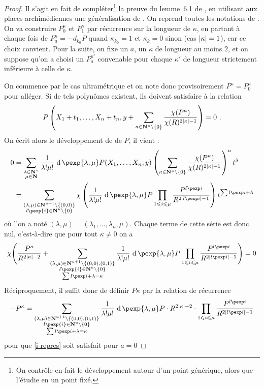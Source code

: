 \begin{proof}
  Il s'agit en fait de compléter\footnote{On contrôle en fait le développement
    autour d'un point générique, alors que  l'étudie en un point
    fixé.} la preuve du lemme~6.1 de \cite{remivds}, en
  utilisant aux places archimédiennes une généralisation de
  \cite[relation~2.3.1, p.~63]{farhith}. On reprend toutes les notations de
  \cite{remivds}. On va construire $P_0^\kappa$ et $P_1^\kappa$ par récurrence
  sur la longueur de $\kappa$, en partant à chaque fois de $P_a^\kappa = -
  d_{k_0}P$ quand $\kappa_{k_0} = 1$ et $\kappa_k = 0$ sinon (cas $\lvert\kappa\rvert
  = 1$), car ce choix convient. Pour la suite, on fixe un $a$, un $\kappa$ de
  longueur au moins $2$, et on suppose qu'on a choisi un $P_a^{\kappa'}$
  convenable pour chaque $\kappa'$ de longueur strictement inférieure à celle
  de $\kappa$.

  On commence par le cas ultramétrique et on note donc provisoirement $P^\kappa
  = P_0^\kappa$ pour alléger. Si de tels polynômes existent, ils doivent
  satisfaire à la relation
  \[
    P\left( X_1+t_1, \ldots, X_n+t_n, y + \sum_{\kappa \in {\mathbf{N}}^u\setminus\{0\}}
    \frac{\chi(P^\kappa)}{\chi(R)^{2\lvert\kappa\rvert -1}}\right) = 0 \text{ .}
  \]
  On écrit alors le développement de  de $P$, il vient :
  \begin{align*}
    0
    & = \sum_{\substack{\lambda\in\N^u \\ \mu \in \N}} \frac1{\lambda!\mu!}\,
      \diff\pexp{\lambda, \mu}P(X_1,\ldots, X_n,y) \left(\sum_{\kappa \in
      \N^u\setminus\{0\}} \frac{\chi(P^\kappa)}{\chi(R)^{2\lgr\kappa -1}}
      \right)^u t^\lambda \\
    & = \sum_{\substack{(\lambda,\mu)\in\N^{u+1}\setminus\{(0,0)\}\\
      l\pexp{i} \in \N^u\setminus\{0\}}} \chi\left( \frac1{\lambda!\mu!}\,
      \diff\pexp{\lambda,\mu}P \prod_{1\le i \le \mu}
      \frac{P^{l\pexp i}}{R^{2\lgr{l\pexp i} -1}} \right)
      t^{\sum l\pexp i + \lambda}
  \end{align*}
  où l'on a noté $(\lambda, \mu) = (\lambda_1, \ldots, \lambda_n, \mu)$. Chaque
  terme de cette série est donc nul, c'est-à-dire que pour tout $\kappa \neq 0$
  on a
  \[
    \chi \Biggl( \frac{P^\kappa}{R^{2\lgr\kappa - 2}} +
    \sum_{\substack{(\lambda,\mu)\in\N^{u+1}\setminus\{(0,0), (0,1)\}\\
    l\pexp{i} \in \N^u\setminus\{0\} \\ \sum l\pexp i + \lambda = \kappa}}
    \frac1{\lambda!\mu!}\,\diff\pexp{\lambda,\mu}P \prod_{1\le i \le \mu}
    \frac{P^{l\pexp i}}{R^{2\lgr{l\pexp i} -1}} \Biggr) = 0
  \]
  Réciproquement, il suffit donc de définir $P\kappa$ par la relation de
  récurrence
  \[ - P^\kappa =
    \sum_{\substack{(\lambda,\mu)\in\N^{u+1}\setminus\{(0,0), (0,1)\}\\
    l\pexp{i} \in \N^u\setminus\{0\} \\ \sum l\pexp i + \lambda = \kappa}}
    \frac1{\lambda!\mu!}\,\diff\pexp{\lambda,\mu}P
    \cdot R^{2\lgr\kappa - 2}
    \cdot \prod_{1\le i \le \mu} \frac{P^{l\pexp i}}{R^{2\lgr{l\pexp i} -1}}
  \]
  pour que \ref{i-repres} soit satisfait pour $a=0$


\end{proof}
